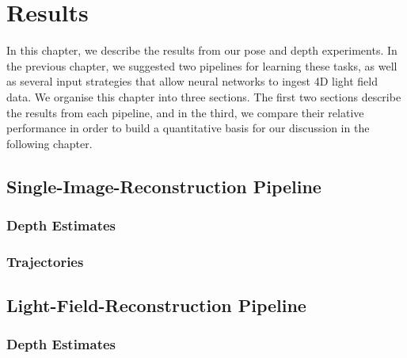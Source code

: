 

\chapter{Results}

In this chapter, we describe the results from our pose and depth experiments. In the previous chapter, we suggested two pipelines for learning these tasks, as well as several input strategies that allow neural networks to ingest 4D light field data. We organise this chapter into three sections. The first two sections describe the results from each pipeline, and in the third, we compare their relative performance in order to build a quantitative basis for our discussion in the following chapter.


\section{Single-Image-Reconstruction Pipeline}


\subsection{Depth Estimates}

\subsection{Trajectories}

\section{Light-Field-Reconstruction Pipeline}


\subsection{Depth Estimates}

